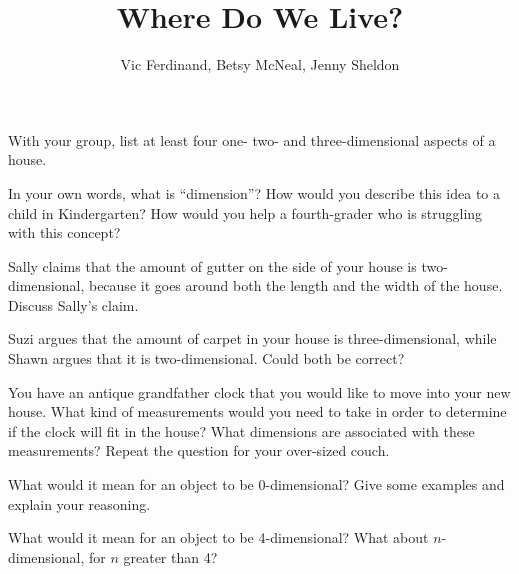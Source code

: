 \documentclass{ximera}
\title{Where Do We Live?}
\author{Vic Ferdinand, Betsy McNeal, Jenny Sheldon}
\begin{document}
\begin{abstract}
\end{abstract}


\maketitle



\begin{problem} \label{WhereLive1}
    With your group, list at least four one- two- and three-dimensional aspects of a house.
\end{problem}

\begin{problem} \label{WhereLive2}
    In your own words, what is ``dimension''?  How would you describe this idea to a child in Kindergarten?  How would you help a fourth-grader who is struggling with this concept?
\end{problem}

\begin{problem} \label{WhereLive3}
    Sally claims that the amount of gutter on the side of your house is two-dimensional, because it goes around both the length and the width of the house.  Discuss Sally's claim.
\end{problem}

\begin{problem} \label{WhereLive4}
    Suzi argues that the amount of carpet in your house is three-dimensional, while Shawn argues that it is two-dimensional.  Could both be correct?
\end{problem}

\begin{problem} \label{WhereLive5}
You have an antique grandfather clock that you would like to move into your new house.  What kind of measurements would you need to take in order to determine if the clock will fit in the house?  What dimensions are associated with these measurements?  Repeat the question for your over-sized couch.
\end{problem}

\begin{problem}
    What would it mean for an object to be 0-dimensional?  Give some examples and explain your reasoning.
\end{problem}

\begin{problem}
    What would it mean for an object to be 4-dimensional?  What about $n$-dimensional, for $n$ greater than 4?
\end{problem}
\end{document}
